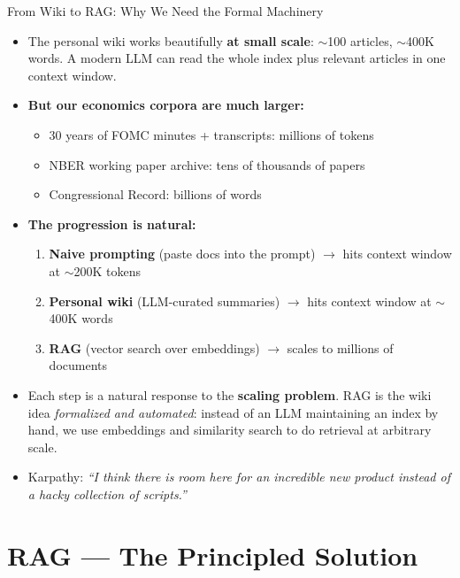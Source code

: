 \documentclass[10pt,english,aspectratio=169]{beamer}
\begin{document}
\begin{frame}{From Wiki to RAG: Why We Need the Formal Machinery}
\begin{itemize}
\item The personal wiki works beautifully \textbf{at small scale}: ${\sim}$100 articles, ${\sim}$400K words. A modern LLM can read the whole index plus relevant articles in one context window.

\medskip
\item \textbf{But our economics corpora are much larger:}
\begin{itemize}
    \item 30 years of FOMC minutes + transcripts: millions of tokens
    \item NBER working paper archive: tens of thousands of papers
    \item Congressional Record: billions of words
\end{itemize}

\medskip
\item \textbf{The progression is natural:}
\begin{enumerate}
    \item \textbf{Naive prompting} (paste docs into the prompt) $\to$ hits context window at ${\sim}$200K tokens
    \item \textbf{Personal wiki} (LLM-curated summaries) $\to$ hits context window at ${\sim}$400K words
    \item \textbf{RAG} (vector search over embeddings) $\to$ scales to millions of documents
\end{enumerate}

\medskip
\item Each step is a natural response to the \textbf{scaling problem}. RAG is the wiki idea \emph{formalized and automated}: instead of an LLM maintaining an index by hand, we use embeddings and similarity search to do retrieval at arbitrary scale.

\medskip
\item Karpathy: \emph{``I think there is room here for an incredible new product instead of a hacky collection of scripts.''}
\end{itemize}
\end{frame}

\section{RAG --- The Principled Solution}
\end{document}
